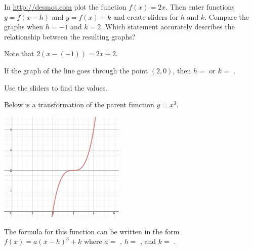 \documentclass{ximera}
\begin{document}
\begin{question}
In \url{http://desmos.com} plot the function $f(x)=2x$. Then enter functions $y=f(x-h)$ and $y=f(x)+k$ and create sliders for $h$ and $k$. Compare the graphs when $h=-1$ and $k=2$. Which statement accurately describes the relationship between the resulting graphs?
  \begin{solution}
    \begin{multiple-choice}
    \end{multiple-choice}
    \begin{hint}
    Note that $2(x-(-1))=2x+2$.
    \end{hint}
If the graph of the line goes through the point $(2,0)$, then $h=$  or $k=$ .  
	\begin{hint}
    Use the sliders to find the values. 
    \end{hint}
  \end{solution}
\end{question}

\begin{question}
Below is a transformation of the parent function $y=x^3$. 
\begin{image}
\includegraphics[width=6cm]{Transformations/2_x-3_cubed+2.png}
\end{image}
The formula for this function can be written in the form $f(x)=a(x-h)^3+k$ where $a=$ , $h=$ , and $k=$ .
\end{question}
\end{document}
